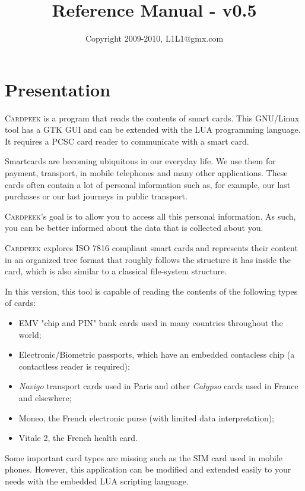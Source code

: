 \documentclass[11pt]{report}
\title{\huge{\Cardpeek{} Reference Manual - v0.5}}
\author{Copyright 2009-2010, L1L1@gmx.com}
\newcommand{\Cardpeek}{\textsc{Cardpeek}}
\begin{document}
\maketitle

\chapter*{Presentation}

\Cardpeek{} is a program that reads the contents of smart cards. 
This GNU/Linux tool has a GTK GUI and can be extended with the LUA programming language. 
It requires a PCSC card reader to communicate with a smart card.

Smartcards are becoming ubiquitous in our everyday life. 
We use them for payment, transport, in mobile telephones and many other applications.
These cards often contain a lot of personal information such as, for example, our last purchases or 
our last journeys in public transport.

\Cardpeek's goal is to allow you to access all this personal information. As such, you 
can be better informed about the data that is collected about you.

\Cardpeek{} explores ISO 7816 compliant smart cards and represents their content in an organized 
tree format that roughly follows the structure it has inside the card, which is also similar to a 
classical file-system structure.

In this version, this tool is capable of reading the contents of the following types of cards:
\begin{itemize}
\item{EMV "chip and PIN" bank cards used in many countries throughout the world;}
\item{Electronic/Biometric passports, which have an embedded contacless chip (a contactless reader is required);}
\item{\textit{Navigo} transport cards used in Paris and other \textit{Calypso} cards used in France and elsewhere;}
\item{Moneo, the French electronic purse (with limited data interpretation);}
\item{Vitale 2, the French health card.}
\end{itemize}

Some important card types are missing such as the SIM card used in mobile phones.
However, this application can be modified and extended easily to your needs with the embedded LUA scripting language.
\end{document}
